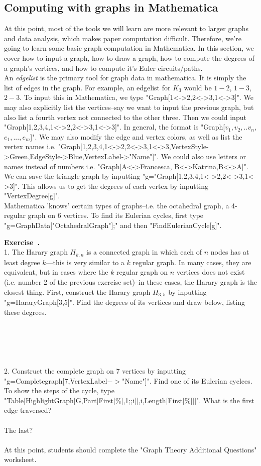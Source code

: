 \documentclass[12pt]{article}
\newcounter{exercise}[section]
\newenvironment{exercise}[1][]{\refstepcounter{exercise}\par\medskip
	\noindent \textbf{Exercise~\thesection.\theexercise #1} \rmfamily}{\medskip}
\begin{document}
\subsection{Computing with graphs in Mathematica}
At this point, most of the tools we will learn are more relevant to larger graphs and data analysis, which makes paper computation difficult. Therefore, we're going to learn some basic graph computation in Mathematica. In this section, we cover how to input a graph, how to draw a graph, how to compute the degrees of a graph's vertices, and how to compute it's Euler circuits/paths.
\\
An \emph{edgelist} is the primary tool for graph data in mathematica. It is simply the list of edges in the graph. For example, an edgelist for $K_3$ would be $1-2$, $1-3$, $2-3$.
To input this in Mathematica, we type "Graph[{1<->2,2<->3,1<->3}]". We may also explicitly list the vertices--say we want to input the previous graph, but also list a fourth vertex not connected to the other three. Then we could input "Graph[{1,2,3,4},{1<->2,2<->3,1<->3}]". In general, the format is "Graph[{$v_1,v_2,..v_n$},{$e_1,...,e_m$}]". We may also modify the edge and vertex colors, as well as list the vertex names i.e. "Graph[{1,2,3,4},{1<->2,2<->3,1<->3},VertexStyle->Green,EdgeStyle->Blue,VertexLabel->"Name"]". We could also use letters or names instead of numbers i.e. "Graph[{A<->Francesca, B<->Katrina,B<->A}]".
\\
We can save the triangle graph by inputting "g="Graph[{1,2,3,4},{1<->2,2<->3,1<->3}]". This allows us to get the degrees of each vertex by inputting "VertexDegree[g]".\\
Mathematica 'knows' certain types of graphs--i.e. the octahedral graph, a 4-regular graph on 6 vertices. To find its Eulerian cycles, first type "g=GraphData["OctahedralGraph"];" and then "FindEulerianCycle[g]".
\begin{exercise}\\
1. The Harary graph $H_{k,n}$ is a connected graph in which each of $n$ nodes has at least degree $k$---this is very similar to a $k$ regular graph. In many cases, they are equivalent, but in cases where the $k$ regular graph on $n$ vertices does not exist (i.e. number 2 of the previous exercise set)--in these cases, the Harary graph is the closest thing. First, construct the Harary graph $H_{3,5}$ by inputting "g=HararyGraph[3,5]". Find the degrees of its vertices and draw below, listing these degrees.
\\
\\
\\
\\
\\
\\
2. Construct the complete graph on $7$ vertices by inputting "g=Completegraph[7,VertexLabel$->$"Name"]". Find one of its Eulerian cyclces. To show the steps of the cycle, type "Table[HighlightGraph[G,Part[First[\%],1;;i]],{i,Length[First[\%]]}]". What is the first edge traversed?
\\
\\
The last?
\\
\end{exercise}
\\At this point, students should complete the "Graph Theory Additional Questions" worksheet.
\end{document}
